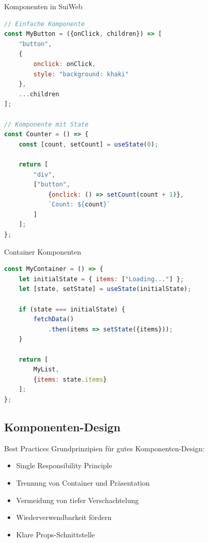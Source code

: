 \begin{KR}{Komponenten in SuiWeb}
\begin{lstlisting}[language=JavaScript, style=basesmol]
// Einfache Komponente
const MyButton = ({onClick, children}) => [
    "button",
    {
        onclick: onClick,
        style: "background: khaki"
    },
    ...children
];

// Komponente mit State
const Counter = () => {
    const [count, setCount] = useState(0);
    
    return [
        "div",
        ["button", 
            {onclick: () => setCount(count + 1)},
            `Count: ${count}`
        ]
    ];
};
\end{lstlisting}
\end{KR}

\begin{KR}{Container Komponenten}
\begin{lstlisting}[language=JavaScript, style=basesmol]
const MyContainer = () => {
    let initialState = { items: ["Loading..."] };
    let [state, setState] = useState(initialState);
    
    if (state === initialState) {
        fetchData()
            .then(items => setState({items}));
    }
    
    return [
        MyList, 
        {items: state.items}
    ];
};
\end{lstlisting}
\end{KR}

\subsection{Komponenten-Design}

\begin{theorem}{Best Practices}
    Grundprinzipien für gutes Komponenten-Design:
    \begin{itemize}
        \item Single Responsibility Principle
        \item Trennung von Container und Präsentation
        \item Vermeidung von tiefer Verschachtelung
        \item Wiederverwendbarkeit fördern
        \item Klare Props-Schnittstelle
    \end{itemize}
\end{theorem}

